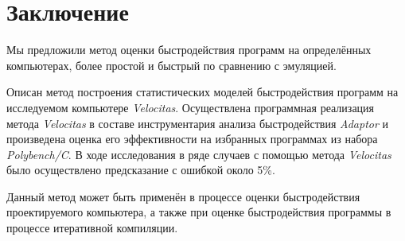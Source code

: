 \section*{Заключение}
Мы предложили метод оценки быстродействия программ на определённых компьютерах, более простой и быстрый по сравнению с эмуляцией.

Описан метод построения статистических моделей быстродействия программ на исследуемом компьютере \textit{Velocitas}. Осуществлена программная реализация метода \textit{Velocitas} в составе инструментария анализа быстродействия \textit{Adaptor} и произведена оценка его эффективности на избранных программах из набора \textit{Polybench/C}. В ходе исследования в ряде случаев с помощью метода \textit{Velocitas} было осуществлено предсказание с ошибкой около 5\%.

Данный метод может быть применён в процессе оценки быстродействия проектируемого компьютера, а также при оценке быстродействия программы в процессе итеративной компиляции.
